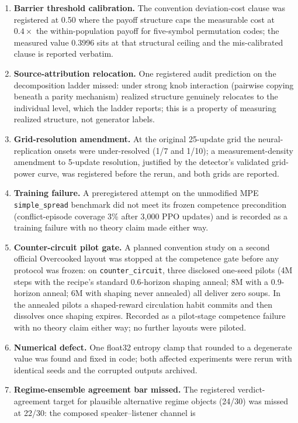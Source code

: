\documentclass[11pt]{article}
\begin{document}
\begin{enumerate}
\item \textbf{Barrier threshold calibration.} The convention
deviation-cost clause was registered at 0.50 where the payoff
structure caps the measurable cost at $0.4\times$ the
within-population payoff for five-symbol permutation codes; the
measured value 0.3996 sits at that structural ceiling and the
mis-calibrated clause is reported verbatim.
\item \textbf{Source-attribution relocation.} One registered audit
prediction on the decomposition ladder missed: under strong knob
interaction (pairwise copying beneath a parity mechanism) realized
structure genuinely relocates to the individual level, which the
ladder reports; this is a property of measuring realized structure,
not generator labels.
\item \textbf{Grid-resolution amendment.} At the original 25-update
grid the neural-replication onsets were under-resolved (1/7 and
1/10); a measurement-density amendment to 5-update resolution,
justified by the detector's validated grid-power curve, was
registered before the rerun, and both grids are reported.
\item \textbf{Training failure.} A preregistered attempt on the
unmodified MPE \texttt{simple\_spread} benchmark did not meet its
frozen competence precondition (conflict-episode coverage 3\% after
3{,}000 PPO updates) and is recorded as a training failure with no
theory claim made either way.
\item \textbf{Counter-circuit pilot gate.} A planned convention study
on a second official Overcooked layout was stopped at the competence
gate before any protocol was frozen: on \texttt{counter\_circuit},
three disclosed one-seed pilots (4M steps with the recipe's standard
0.6-horizon shaping anneal; 8M with a 0.9-horizon anneal; 6M with
shaping never annealed) all deliver zero soups. In the annealed
pilots a shaped-reward circulation habit commits and then dissolves
once shaping expires. Recorded as a pilot-stage competence failure
with no theory claim either way; no further layouts were piloted.
\item \textbf{Numerical defect.} One float32 entropy clamp that
rounded to a degenerate value was found and fixed in code; both
affected experiments were rerun with identical seeds and the
corrupted outputs archived.
\item \textbf{Regime-ensemble agreement bar missed.} The registered
verdict-agreement target for plausible alternative regime objects
(24/30) was missed at 22/30: the composed speaker--listener channel is

\end{enumerate}
\end{document}
